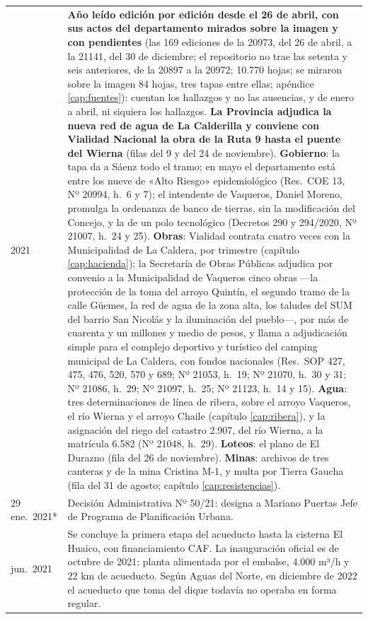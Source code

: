 \begin{longtable}{@{}p{2.7cm}p{10.3cm}@{}}
2021 & \textbf{Año leído edición por edición desde el 26 de abril, con sus actos del departamento mirados sobre la imagen y con pendientes} (las 169 ediciones de la 20973, del 26 de abril, a la 21141, del 30 de diciembre; el repositorio no trae las setenta y seis anteriores, de la 20897 a la 20972; 10.770 hojas; se miraron sobre la imagen 84 hojas, tres tapas entre ellas; apéndice \ref{cap:fuentes}): cuentan los hallazgos y no las ausencias, y de enero a abril, ni siquiera los hallazgos. \textbf{La Provincia adjudica la nueva red de agua de La Calderilla y conviene con Vialidad Nacional la obra de la Ruta 9 hasta el puente del Wierna} (filas del 9 y del 24 de noviembre). \textbf{Gobierno}: la tapa da a Sáenz todo el tramo; en mayo el departamento está entre los nueve de «Alto Riesgo» epidemiológico (Res.\ COE 13, Nº 20994, h.\ 6 y 7); el intendente de Vaqueros, Daniel Moreno, promulga la ordenanza de banco de tierras, sin la modificación del Concejo, y la de un polo tecnológico (Decretos 290 y 294/2020, Nº 21007, h.\ 24 y 25). \textbf{Obras}: Vialidad contrata cuatro veces con la Municipalidad de La Caldera, por trimestre (capítulo \ref{cap:hacienda}); la Secretaría de Obras Públicas adjudica por convenio a la Municipalidad de Vaqueros cinco obras ---la protección de la toma del arroyo Quintín, el segundo tramo de la calle Güemes, la red de agua de la zona alta, los taludes del SUM del barrio San Nicolás y la iluminación del pueblo---, por más de cuarenta y un millones y medio de pesos, y llama a adjudicación simple para el complejo deportivo y turístico del camping municipal de La Caldera, con fondos nacionales (Res.\ SOP 427, 475, 476, 520, 570 y 689; Nº 21053, h.\ 19; Nº 21070, h.\ 30 y 31; Nº 21086, h.\ 29; Nº 21097, h.\ 25; Nº 21123, h.\ 14 y 15). \textbf{Agua}: tres determinaciones de línea de ribera, sobre el arroyo Vaqueros, el río Wierna y el arroyo Chaile (capítulo \ref{cap:ribera}), y la asignación del riego del catastro 2.907, del río Wierna, a la matrícula 6.582 (Nº 21048, h.\ 29). \textbf{Loteos}: el plano de El Durazno (fila del 26 de noviembre). \textbf{Minas}: archivos de tres canteras y de la mina Cristina M-1, y multa por Tierra Gaucha (fila del 31 de agosto; capítulo \ref{cap:resistencias}). \\
29 ene.\ 2021* & Decisión Administrativa Nº 50/21: designa a Mariano Puertas Jefe de Programa de Planificación Urbana. \\
jun.\ 2021 & Se concluye la primera etapa del acueducto hasta la cisterna El Huaico, con financiamiento CAF. La inauguración oficial es de octubre de 2021: planta alimentada por el embalse, 4.000 m³/h y 22 km de acueducto. Según Aguas del Norte, en diciembre de 2022 el acueducto que toma del dique todavía no operaba en forma regular. \\

\end{longtable}
